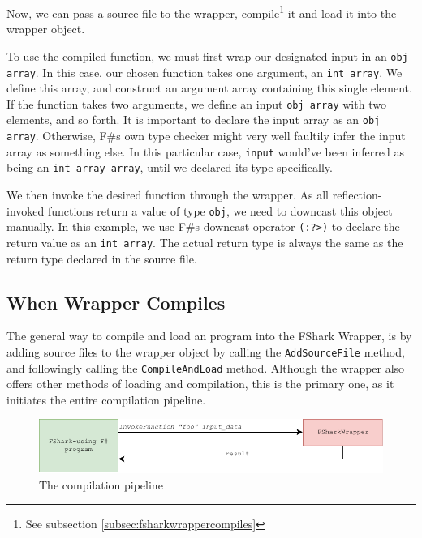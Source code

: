 Now, we can pass a source file to the \fshark{} wrapper, compile\footnote{See
  subsection \ref{subsec:fsharkwrappercompiles}} it and load it into the \fshark{} wrapper object.

To use the compiled \fshark{} function, we must first wrap our designated input in
an \texttt{obj array}. In this case, our chosen \fshark{} function takes one
argument, an \texttt{int array}. We define this array, and construct an argument
array containing this single element. If the \fshark{} function takes two
arguments, we define an input \texttt{obj array} with two elements, and so
forth.
It is important to declare the input array as an \texttt{obj array}. Otherwise,
F\#s own type checker might very well faultily infer the input array as
something else. In this particular case, \texttt{input} would've been inferred
as being an \texttt{int array array}, until we declared its type specifically.

We then invoke the desired function through the wrapper. As all
reflection-invoked functions return a value of type \texttt{obj}, we need to
downcast this object manually.
In this example, we use F\#s downcast operator \texttt{(:?>)} to declare the
return value as an \texttt{int array}. The actual return type is always the same as the
return type declared in the source \fshark{} file.

\subsection*{When \fshark{} Wrapper Compiles}
\label{sec:fsharkwrappercompiles}
The general way to compile and load an \fshark{} program into the FShark Wrapper,
is by adding \fshark{} source files to the wrapper object by calling the
\texttt{AddSourceFile} method, and followingly calling the \texttt{CompileAndLoad}
method. Although the \fshark{} wrapper also offers other methods of loading and
compilation, this is the primary one, as it initiates the entire \fshark{}
compilation pipeline.

\begin{figure}[h]
  \centering
  \includegraphics{chapters/figs/csharp/pipeline_step_3.pdf}
  \caption{The \fshark{} compilation pipeline}
  \label{fig:fsharkcompilerpipeline}
\end{figure}


